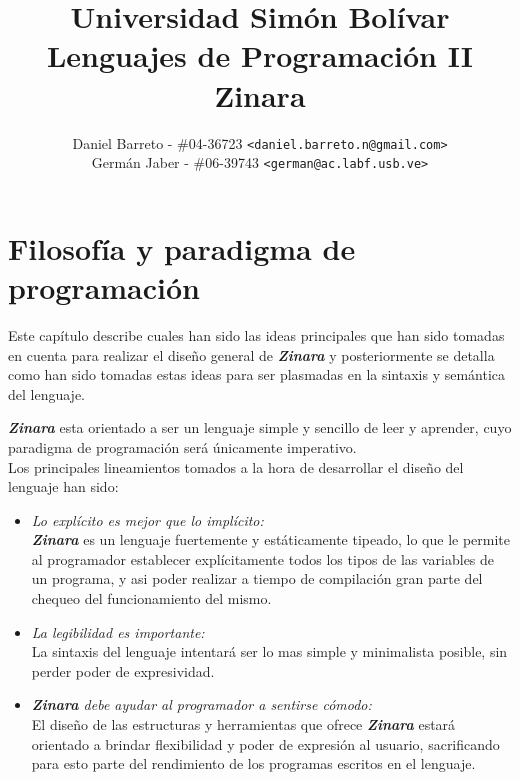 \documentclass[12pt, spanish]{report}
\begin{document}
\title{Universidad Sim\'on Bol\'ivar \\ Lenguajes de Programaci\'on II \\ Zinara}
\author{
  Daniel Barreto - \#04-36723 \texttt{<daniel.barreto.n@gmail.com>} \\
  Germ\'an Jaber - \#06-39743 \texttt{<german@ac.labf.usb.ve>}
}
\maketitle

\tableofcontents

\newpage
\chapter{Filosof\'ia y paradigma de programaci\'on}
\label{chap:diseno}

Este cap\'itulo describe cuales han sido las ideas principales que han
sido tomadas en cuenta para realizar el dise\~no general de
\emph{\textbf{Zinara}} y posteriormente se detalla como han sido
tomadas estas ideas para ser plasmadas en la sintaxis y sem\'antica del
lenguaje.

\textbf{\emph{Zinara}} esta orientado a ser un lenguaje simple y
sencillo de leer y aprender, cuyo paradigma de programaci\'on ser\'a
\'unicamente imperativo.\\

Los principales lineamientos tomados a la hora de desarrollar el
dise\~no del lenguaje han sido:

\begin{itemize}
\item \emph{Lo expl\'icito es mejor que lo impl\'icito:}\\
  \emph{\textbf{Zinara}} es un lenguaje fuertemente y est\'aticamente
  tipeado, lo que le permite al programador establecer expl\'icitamente
  todos los tipos de las variables de un programa, y asi poder
  realizar a tiempo de compilaci\'on gran parte del chequeo del
  funcionamiento del mismo.

\item \emph{La legibilidad es importante:}\\
  La sintaxis del lenguaje intentar\'a ser lo mas simple y minimalista
  posible, sin perder poder de expresividad.

\item \emph{\textbf{Zinara} debe ayudar al programador a sentirse
    c\'omodo:}\\
  El dise\~no de las estructuras y herramientas que ofrece
  \emph{\textbf{Zinara}} estar\'a orientado a brindar flexibilidad y
  poder de expresi\'on al usuario, sacrificando para esto parte del
  rendimiento de los programas escritos en el lenguaje.
\end{itemize}
\end{document}

